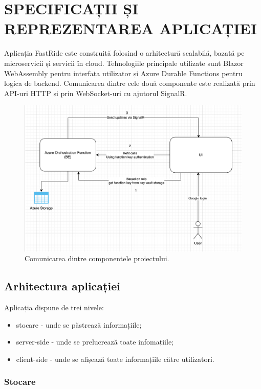 \chapter{SPECIFICAȚII ȘI REPREZENTAREA APLICAȚIEI}
Aplicația FastRide este construită folosind o arhitectură scalabilă, bazată pe microservicii și servicii în cloud. Tehnologiile principale utilizate sunt Blazor WebAssembly pentru interfața utilizator și Azure Durable Functions pentru logica de backend. Comunicarea dintre cele două componente este realizată prin API-uri HTTP și prin WebSocket-uri cu ajutorul SignalR.
\begin{figure}[H]
    \centering
    \includegraphics[width=14cm]{Assets/componentsComunication.png}
    \caption{Comunicarea dintre componentele proiectului.}
    \label{fig:componentsComunication}
\end{figure}

\section{Arhitectura aplicației}
Aplicația dispune de trei nivele:
\begin{itemize}
    \item stocare - unde se păstrează informațiile;
    \item server-side - unde se prelucrează toate infomațiile;
    \item client-side - unde se afișează toate informațiile către utilizatori.
\end{itemize}

\subsection{Stocare}

